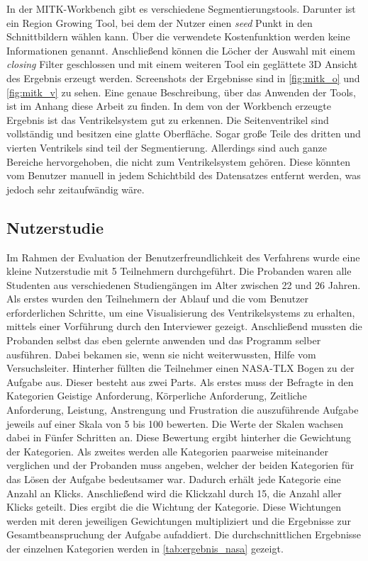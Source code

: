 In der MITK-Workbench gibt es verschiedene Segmentierungstools. Darunter ist ein Region Growing Tool, bei dem der Nutzer einen \textit{seed} Punkt in den Schnittbildern wählen kann. Über die verwendete Kostenfunktion werden keine Informationen genannt.
Anschließend können die Löcher der Auswahl mit einem \textit{closing} Filter geschlossen und mit einem weiteren Tool ein geglättete 3D Ansicht des Ergebnis erzeugt werden.
\newline
Screenshots der Ergebnisse sind in \autoref{fig:mitk_o} und \autoref{fig:mitk_v} zu sehen. Eine genaue Beschreibung, über das Anwenden der Tools, ist im Anhang diese Arbeit zu finden.
In dem von der Workbench erzeugte Ergebnis ist das Ventrikelsystem gut zu erkennen. Die Seitenventrikel sind vollständig und besitzen eine glatte Oberfläche. Sogar große Teile des dritten und vierten Ventrikels sind teil der Segmentierung.
Allerdings sind auch ganze Bereiche hervorgehoben, die nicht zum Ventrikelsystem gehören. Diese könnten vom Benutzer manuell in jedem Schichtbild des Datensatzes entfernt werden, was jedoch sehr zeitaufwändig wäre.


\subsection{Nutzerstudie}


Im Rahmen der Evaluation der Benutzerfreundlichkeit des Verfahrens wurde eine kleine Nutzerstudie mit 5 Teilnehmern durchgeführt. Die Probanden waren alle Studenten aus verschiedenen Studiengängen im Alter zwischen 22 und 26 Jahren.
Als erstes wurden den Teilnehmern der Ablauf und die vom Benutzer erforderlichen Schritte, um eine Visualisierung des Ventrikelsystems zu erhalten, mittels einer Vorführung durch den Interviewer gezeigt.
Anschließend mussten die Probanden selbst das eben gelernte anwenden und das Programm selber ausführen. Dabei bekamen sie, wenn sie nicht weiterwussten, Hilfe vom Versuchsleiter.
\newline
Hinterher füllten die Teilnehmer einen NASA-TLX Bogen zu der Aufgabe aus. Dieser besteht aus zwei Parts. Als erstes muss der Befragte in den Kategorien Geistige Anforderung, Körperliche Anforderung, Zeitliche Anforderung, Leistung, Anstrengung und Frustration die auszuführende Aufgabe jeweils auf einer Skala von 5 bis 100 bewerten. Die Werte der Skalen wachsen dabei in Fünfer Schritten an. Diese Bewertung ergibt hinterher die Gewichtung der Kategorien.
Als zweites werden alle Kategorien paarweise miteinander verglichen und der Probanden muss angeben, welcher der beiden Kategorien für das Lösen der Aufgabe bedeutsamer war. Dadurch erhält jede Kategorie eine Anzahl an Klicks.
Anschließend wird die Klickzahl durch 15, die Anzahl aller Klicks geteilt. Dies ergibt die die Wichtung der Kategorie. Diese Wichtungen werden mit deren jeweiligen Gewichtungen multipliziert und die Ergebnisse zur Gesamtbeanspruchung der Aufgabe aufaddiert.
Die durchschnittlichen Ergebnisse der einzelnen Kategorien werden in \autoref{tab:ergebnis_nasa} gezeigt.


